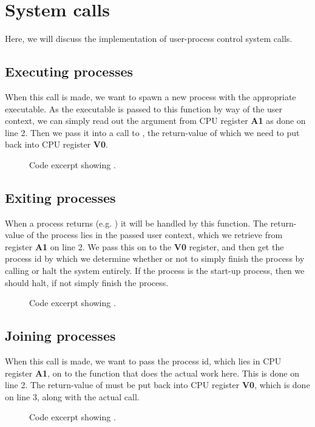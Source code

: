%
%
%

\section{System calls}
Here, we will discuss the implementation of user-process control system calls.

\subsection{Executing processes}
When this call is made, we want to spawn a new process with the appropriate
executable. As the executable is passed to this function by way of the user
context, we can simply read out the argument from CPU register {\bf A1} as
done on line 2. Then we pass it into a call to , the
return-value of which we need to put back into CPU register {\bf V0}.

\begin{figure}[H]
    
    \caption{Code excerpt showing .}
    \label{code:handle_syscall_exec}
\end{figure}


\subsection{Exiting processes}
When a process returns (e.g. ) it will be handled by this
function. The return-value of the process lies in the passed user context,
which we retrieve from register {\bf A1} on line 2. We pass this on to the
{\bf V0} register, and then get the process id by which we determine whether
or not to simply finish the process by calling  or halt
the system entirely. If the process is the start-up process, then we should
halt, if not simply finish the process.

\begin{figure}[H]
    
    \caption{Code excerpt showing .}
    \label{code:handle_syscall_exit}
\end{figure}


\subsection{Joining processes}
When this call is made, we want to pass the process id, which lies in CPU
register {\bf A1}, on to the  function that does the
actual work here. This is done on line 2. The return-value of
 must be put back into CPU register {\bf V0}, which is
done on line 3, along with the actual call.

\begin{figure}[H]
    
    \caption{Code excerpt showing .}
    \label{code:handle_syscall_join}
\end{figure}

